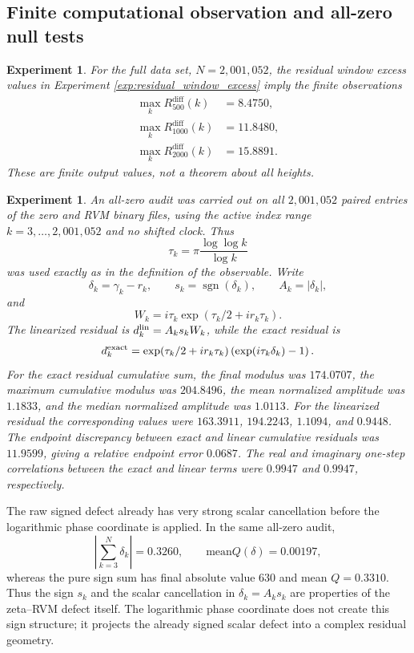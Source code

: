 \documentclass[12pt]{article}
\numberwithin{equation}{section}
\newtheorem{experiment}[theorem]{Experiment}
\newcommand{\diff}{\mathrm{diff}}
\newcommand{\mean}{\mathrm{mean}}
\begin{document}
\subsection{Finite computational observation and all-zero null tests}
\label{sec:finite_computational_observation}

\begin{experiment}
\label{exp:finite_residual_window_excess_summary}
For the full data set, \(N=2,001,052\), the residual window excess values in Experiment \ref{exp:residual_window_excess} imply the finite observations
\begin{align}
\max_k R_{500}^{\diff}(k)
&=
8.4750,
\label{eq:obs_residual_excess_500_exact}
\\
\max_k R_{1000}^{\diff}(k)
&=
11.8480,
\label{eq:obs_residual_excess_1000_exact}
\\
\max_k R_{2000}^{\diff}(k)
&=
15.8891.
\label{eq:obs_residual_excess_2000_exact}
\end{align}
These are finite output values, not a theorem about all heights.
\end{experiment}

\begin{experiment}
\label{exp:all_zero_sign_amplitude_coordinate_audit}
An all-zero audit was carried out on all \(2,001,052\) paired entries of the zero and RVM binary files, using the active index range \(k=3,\ldots,2,001,052\) and no shifted clock.  Thus
\[
\tau_k=\pi\frac{\log\log k}{\log k}
\]
was used exactly as in the definition of the observable.  Write
\[
\delta_k=\gamma_k-r_k,\qquad
s_k=\operatorname{sgn}(\delta_k),\qquad
A_k=|\delta_k|,
\]
and
\[
W_k=i\tau_k\exp(\tau_k/2+i r_k\tau_k).
\]
The linearized residual is \(d_k^{\rm lin}=A_ks_kW_k\), while the exact residual is
\[
d_k^{\rm exact}
=
\exp(\tau_k/2+i r_k\tau_k)
\left(\exp(i\tau_k\delta_k)-1\right).
\]
For the exact residual cumulative sum, the final modulus was \(174.0707\), the maximum cumulative modulus was \(204.8496\), the mean normalized amplitude was \(1.1833\), and the median normalized amplitude was \(1.0113\).  For the linearized residual the corresponding values were \(163.3911\), \(194.2243\), \(1.1094\), and \(0.9448\).  The endpoint discrepancy between exact and linear cumulative residuals was \(11.9599\), giving a relative endpoint error \(0.0687\).  The real and imaginary one-step correlations between the exact and linear terms were \(0.9947\) and \(0.9947\), respectively.
\end{experiment}

\noindent The raw signed defect already has very strong scalar cancellation before the logarithmic phase coordinate is applied.  In the same all-zero audit,
\[
\left|\sum_{k=3}^{N}\delta_k\right|
=
0.3260,
\qquad
\mean Q(\delta)
=
0.00197,
\]
whereas the pure sign sum has final absolute value \(630\) and mean \(Q=0.3310\).  Thus the sign \(s_k\) and the scalar cancellation in \(\delta_k=A_ks_k\) are properties of the zeta--RVM defect itself.  The logarithmic phase coordinate does not create this sign structure; it projects the already signed scalar defect into a complex residual geometry.
\end{document}
